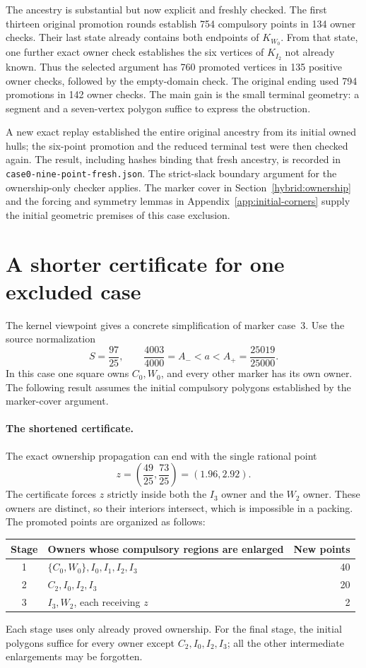 \documentclass[11pt]{article}
\begin{document}
The ancestry is substantial but now explicit and freshly checked.  The
first thirteen original promotion rounds establish 754 compulsory points
in 134 owner checks.  Their last state already contains both endpoints of
$K_{W_0}$.  From that state, one further exact owner check establishes the
six vertices of $K_{I_2}$ not already known.  Thus the selected argument
has 760 promoted vertices in 135 positive owner checks, followed by the
empty-domain check.  The original ending used 794 promotions in 142 owner
checks.  The main gain is the small terminal geometry: a segment and a
seven-vertex polygon suffice to express the obstruction.

A new exact replay established the entire original ancestry from its
initial owned hulls; the six-point promotion and the reduced terminal test
were then checked again.  The result, including hashes binding that fresh
ancestry, is recorded in \texttt{case0-nine-point-fresh.json}.  The
strict-slack boundary argument for the ownership-only checker applies.
The marker cover in Section~\ref{hybrid:ownership} and the forcing and
symmetry lemmas in Appendix~\ref{app:initial-corners} supply the initial
geometric premises of this case exclusion.


\section{A shorter certificate for one excluded case}
\label{sec:short-case-three}

The kernel viewpoint gives a concrete simplification of marker case~3.
Use the source normalization
\[
 S=\frac{97}{25},\qquad
 \frac{4003}{4000}=A_-<a<A_+=\frac{25019}{25000}.
\]
In this case one square owns $C_0,W_0$, and every other marker has its own
owner.  The following result assumes the initial compulsory polygons
established by the marker-cover argument.

\paragraph{The shortened certificate.}
The exact ownership propagation can end with the single rational point
\[
 z=\left(\frac{49}{25},\frac{73}{25}\right)=(1.96,2.92).
\]
The certificate forces $z$ strictly inside both the $I_3$ owner and the
$W_2$ owner.  These owners are distinct, so their interiors intersect,
which is impossible in a packing.  The promoted points are organized as
follows:
\begin{center}
\begin{tabular}{c l r}
Stage & Owners whose compulsory regions are enlarged & New points\\
\hline
1 & $\{C_0,W_0\}, I_0,I_1,I_2,I_3$ & 40\\
2 & $C_2,I_0,I_2,I_3$ & 20\\
3 & $I_3,W_2$, each receiving $z$ & 2
\end{tabular}
\end{center}
Each stage uses only already proved ownership.  For the final stage, the
initial polygons suffice for every owner except $C_2,I_0,I_2,I_3$; all the
other intermediate enlargements may be forgotten.
\end{document}
